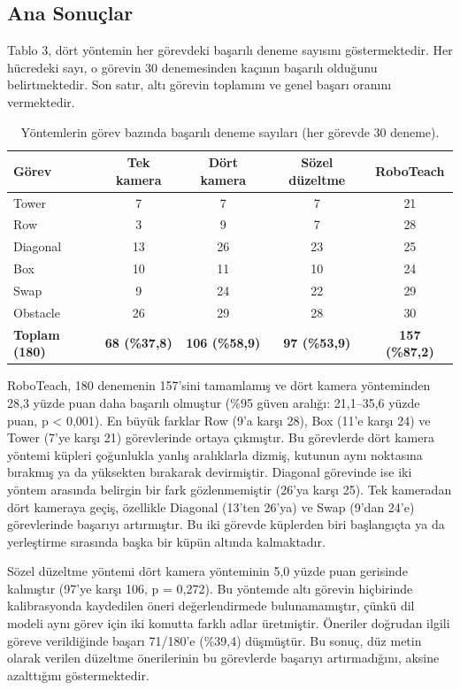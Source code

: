 \documentclass[preprint,12pt]{elsarticle}
\begin{document}
\hypertarget{ana-sonuuxe7lar}{%
\subsection{Ana Sonuçlar}\label{ana-sonuuxe7lar}}

Tablo 3, dört yöntemin her görevdeki başarılı deneme sayısını göstermektedir. Her hücredeki sayı, o görevin 30 denemesinden kaçının başarılı olduğunu belirtmektedir. Son satır, altı görevin toplamını ve genel başarı oranını vermektedir.

\begin{table}[htbp]
\centering
\caption{Yöntemlerin görev bazında başarılı deneme sayıları (her görevde 30 deneme).}
\label{tab:3}
\begin{tabularx}{\textwidth}{@{}l C C C C@{}}
\toprule
Görev & Tek kamera & Dört kamera & Sözel düzeltme & RoboTeach \\
\midrule
Tower & 7 & 7 & 7 & 21 \\
Row & 3 & 9 & 7 & 28 \\
Diagonal & 13 & 26 & 23 & 25 \\
Box & 10 & 11 & 10 & 24 \\
Swap & 9 & 24 & 22 & 29 \\
Obstacle & 26 & 29 & 28 & 30 \\
\midrule
\textbf{Toplam (180)} & \textbf{68 (\%37,8)} & \textbf{106 (\%58,9)} & \textbf{97 (\%53,9)} & \textbf{157 (\%87,2)} \\
\bottomrule
\end{tabularx}
\end{table}

RoboTeach, 180 denemenin 157'sini tamamlamış ve dört kamera yönteminden 28,3 yüzde puan daha başarılı olmuştur (\%95 güven aralığı: 21,1--35,6 yüzde puan, p \textless{} 0,001). En büyük farklar Row (9'a karşı 28), Box (11'e karşı 24) ve Tower (7'ye karşı 21) görevlerinde ortaya çıkmıştır. Bu görevlerde dört kamera yöntemi küpleri çoğunlukla yanlış aralıklarla dizmiş, kutunun aynı noktasına bırakmış ya da yüksekten bırakarak devirmiştir. Diagonal görevinde ise iki yöntem arasında belirgin bir fark gözlenmemiştir (26'ya karşı 25). Tek kameradan dört kameraya geçiş, özellikle Diagonal (13'ten 26'ya) ve Swap (9'dan 24'e) görevlerinde başarıyı artırmıştır. Bu iki görevde küplerden biri başlangıçta ya da yerleştirme sırasında başka bir küpün altında kalmaktadır.

Sözel düzeltme yöntemi dört kamera yönteminin 5,0 yüzde puan gerisinde kalmıştır (97'ye karşı 106, p = 0,272). Bu yöntemde altı görevin hiçbirinde kalibrasyonda kaydedilen öneri değerlendirmede bulunamamıştır, çünkü dil modeli aynı görev için iki komutta farklı adlar üretmiştir. Öneriler doğrudan ilgili göreve verildiğinde başarı 71/180'e (\%39,4) düşmüştür. Bu sonuç, düz metin olarak verilen düzeltme önerilerinin bu görevlerde başarıyı artırmadığını, aksine azalttığını göstermektedir.
\end{document}
